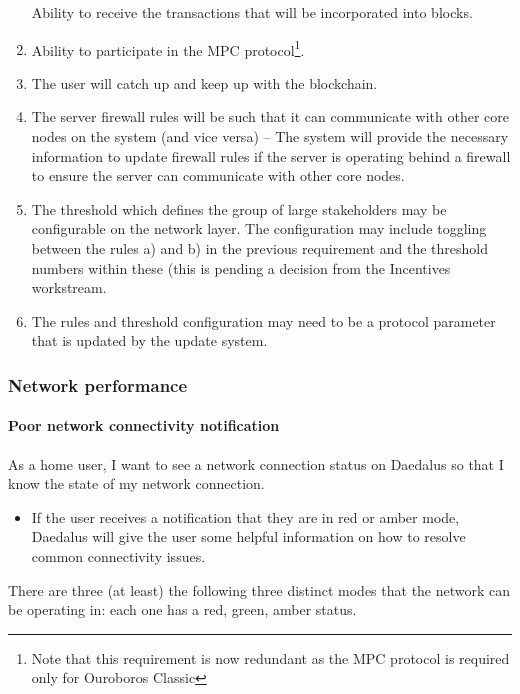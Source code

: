 \documentclass[11pt,a4paper]{article}
\begin{document}
\begin{enumerate}
  Ability to receive the transactions that will be incorporated into
  blocks.
\item
  Ability to participate in the MPC protocol\footnote{Note that this
    requirement is now redundant as the MPC protocol is required only
    for Ouroboros Classic}.
\item
  The user will catch up and keep up with the blockchain.
\item
  The server firewall rules will be such that it can communicate with
  other core nodes on the system (and vice versa) -- The system will
  provide the necessary information to update firewall rules if the
  server is operating behind a firewall to ensure the server can
  communicate with other core nodes.
\item
  The threshold which defines the group of large stakeholders may be
  configurable on the network layer. The configuration may include
  toggling between the rules a) and b) in the previous requirement and
  the threshold numbers within these (this is pending a decision from
  the Incentives workstream.
\item
  The rules and threshold configuration may need to be a protocol
  parameter that is updated by the update system.
\end{enumerate}

\subsubsection{Network performance}
\label{network-performance}

\paragraph{Poor network connectivity notification}

As a home user, I want to see a network connection status on Daedalus so
that I know the state of my network connection.

\begin{itemize}
\item
  If the user receives a notification that they are in red or amber
  mode, Daedalus will give the user some helpful information on how to
  resolve common connectivity issues.
\end{itemize}

There are three (at least) the following three distinct modes that the
network can be operating in: each one has a red, green, amber status.
\end{document}
